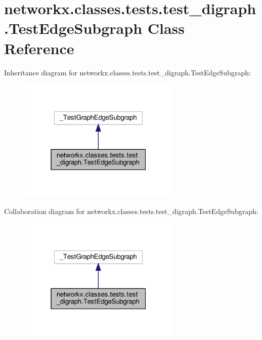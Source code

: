 \hypertarget{classnetworkx_1_1classes_1_1tests_1_1test__digraph_1_1TestEdgeSubgraph}{}\section{networkx.\+classes.\+tests.\+test\+\_\+digraph.\+Test\+Edge\+Subgraph Class Reference}
\label{classnetworkx_1_1classes_1_1tests_1_1test__digraph_1_1TestEdgeSubgraph}


Inheritance diagram for networkx.\+classes.\+tests.\+test\+\_\+digraph.\+Test\+Edge\+Subgraph\+:
\nopagebreak
\begin{figure}[H]
\begin{center}
\leavevmode
\includegraphics[width=220pt]{classnetworkx_1_1classes_1_1tests_1_1test__digraph_1_1TestEdgeSubgraph__inherit__graph}
\end{center}
\end{figure}


Collaboration diagram for networkx.\+classes.\+tests.\+test\+\_\+digraph.\+Test\+Edge\+Subgraph\+:
\nopagebreak
\begin{figure}[H]
\begin{center}
\leavevmode
\includegraphics[width=220pt]{classnetworkx_1_1classes_1_1tests_1_1test__digraph_1_1TestEdgeSubgraph__coll__graph}
\end{center}
\end{figure}
